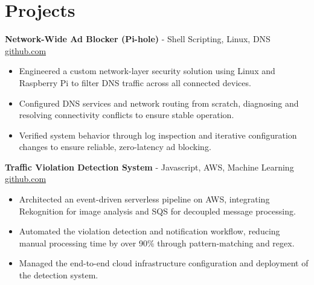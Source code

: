 \documentclass[11pt]{article}       %
\begin{document}

\vspace{-18.5pt}

\section*{Projects}

\textbf{Network-Wide Ad Blocker (Pi-hole)}{ - Shell Scripting, Linux, DNS} \hfill \href{https://github.com/Monica20030707}{github.com} \\
\vspace{-9pt}
\begin{itemize}
  \item Engineered a custom network-layer security solution using Linux and Raspberry Pi to filter DNS traffic across all connected devices.
  \item Configured DNS services and network routing from scratch, diagnosing and resolving connectivity conflicts to ensure stable operation.
  \item Verified system behavior through log inspection and iterative configuration changes to ensure reliable, zero-latency ad blocking.
\end{itemize}

\textbf{Traffic Violation Detection System}{ - Javascript, AWS, Machine Learning} \hfill \href{https://github.com/Monica20030707/AWS_rekonigition-N-read-database}{github.com} \\
\vspace{-9pt}
\begin{itemize}
  \item Architected an event-driven serverless pipeline on AWS, integrating Rekognition for image analysis and SQS for decoupled message processing.
  \item Automated the violation detection and notification workflow, reducing manual processing time by over 90\% through pattern-matching and regex.
  \item Managed the end-to-end cloud infrastructure configuration and deployment of the detection system.
\end{itemize}
\end{document}
